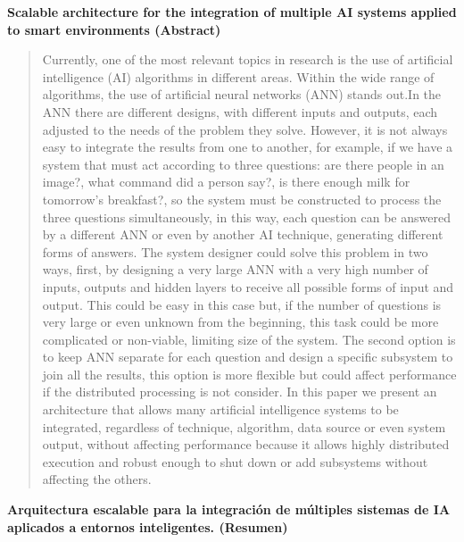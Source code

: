\textbf{Scalable architecture for the integration of multiple AI systems applied to smart environments (Abstract)}
\begin{quote}
Currently, one of the most relevant topics in research is the use of artificial intelligence (AI) algorithms in different areas. Within the wide range of algorithms, the use of artificial neural networks (ANN) stands out.In the ANN there are different designs, with different inputs and outputs, each adjusted to the needs of the problem they solve. However, it is not always easy to integrate the results from one to another, for example, if we have a system that must act according to three questions: are there people in an image?, what command did a person say?, is there enough milk for tomorrow's breakfast?, so the system must be constructed to process the three questions simultaneously, in this way, each question can be answered by a different ANN or even by another AI technique, generating different forms of answers. The system designer could solve this problem in two ways, first, by designing a very large ANN with a very high number of inputs, outputs and hidden layers to receive all possible forms of input and output. This could be easy in this case but, if the number of questions is very large or even unknown from the beginning, this task could be more complicated or non-viable, limiting size of the system. The second option is to keep ANN separate for each question and design a specific subsystem to join all the results, this option is more flexible but could affect performance if the distributed processing is not consider. In this paper we present an architecture that allows many artificial intelligence systems to be integrated, regardless of technique, algorithm, data source or even system output, without affecting performance because it allows highly distributed execution and robust enough to shut down or add subsystems without affecting the others.
\end{quote}
\textbf{Arquitectura escalable para la integración de múltiples sistemas de IA aplicados a entornos inteligentes. (Resumen)}
